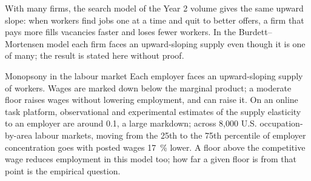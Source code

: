 \begin{omfigure}
\par{}
\end{omfigure}

With many firms, the search model of the Year 2 volume gives the same upward slope:
when workers find jobs one at a time and quit to better offers, a firm that pays
more fills vacancies faster and loses fewer workers. In the Burdett--Mortensen model
each firm faces an upward-sloping supply even though it is one of many; the result
is stated here without proof.

\begin{model}{Monopsony in the labour market}
\assumes Each employer faces an upward-sloping supply of workers.
\predicts Wages are marked down below the marginal product; a moderate floor raises
wages without lowering employment, and can raise it.
\tested On an online task platform, observational and experimental estimates of
the supply elasticity to an employer are around 0.1, a large markdown; %
across 8{,}000 U.S. occupation-by-area labour markets, moving from the 25th to the 75th percentile
of employer concentration goes with posted wages 17~\% lower. %
\breaks A floor above the competitive wage reduces employment in this model too;
how far a given floor is from that point is the empirical question.
\end{model}

